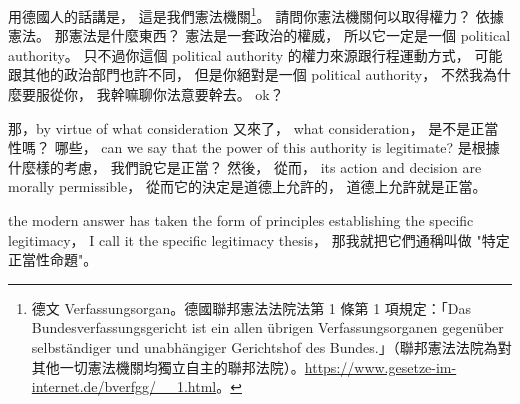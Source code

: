 \hypertarget{w02:cue:1216}{}用德國人的話講是，
\hypertarget{w02:cue:1217}{}這是我們憲法機關\footnote{德文 Verfassungsorgan。德國聯邦憲法法院法第 1 條第 1 項規定：「Das Bundesverfassungsgericht ist ein allen übrigen Verfassungsorganen gegenüber selbständiger und unabhängiger Gerichtshof des Bundes.」（聯邦憲法法院為對其他一切憲法機關均獨立自主的聯邦法院）。\url{https://www.gesetze-im-internet.de/bverfgg/__1.html}。}。
\hypertarget{w02:cue:1218}{}請問你憲法機關何以取得權力？
\hypertarget{w02:cue:1219}{}依據憲法。
\hypertarget{w02:cue:1220}{}那憲法是什麼東西？
\hypertarget{w02:cue:1221}{}憲法是一套政治的權威，
\hypertarget{w02:cue:1222}{}所以它一定是一個 political authority。
\hypertarget{w02:cue:1223}{}只不過你這個 political authority 的權力來源跟行程運動方式，
\hypertarget{w02:cue:1224}{}可能跟其他的政治部門也許不同，
\hypertarget{w02:cue:1225}{}但是你絕對是一個 political authority，
\hypertarget{w02:cue:1226}{}不然我為什麼要服從你，
\hypertarget{w02:cue:1227}{}我幹嘛聊你法意要幹去。
\hypertarget{w02:cue:1228}{}ok？

\hypertarget{w02:cue:1229}{}那，by virtue of what consideration 又來了，
\hypertarget{w02:cue:1230}{}what consideration，
\hypertarget{w02:cue:1231}{}是不是正當性嗎？
\hypertarget{w02:cue:1232}{}哪些，
\hypertarget{w02:cue:1233}{}can we say that the power of this authority is legitimate?
\hypertarget{w02:cue:1234}{}是根據什麼樣的考慮，
\hypertarget{w02:cue:1235}{}我們說它是正當？
\hypertarget{w02:cue:1236}{}然後，
\hypertarget{w02:cue:1237}{}從而，
\hypertarget{w02:cue:1238}{}its action and decision are morally permissible，
\hypertarget{w02:cue:1239}{}從而它的決定是道德上允許的，
\hypertarget{w02:cue:1240}{}道德上允許就是正當。

\hypertarget{w02:cue:1241}{}the modern answer has taken the form of principles
\hypertarget{w02:cue:1242}{}establishing the specific legitimacy，
\hypertarget{w02:cue:1243}{}I call it the specific legitimacy thesis，
\hypertarget{w02:cue:1244}{}那我就把它們通稱叫做
\hypertarget{w02:cue:1245}{}"特定正當性命題"。

